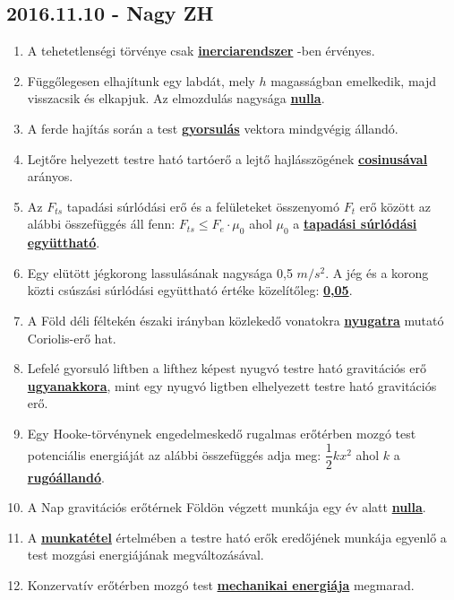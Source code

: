 \documentclass[../../fizika_kerdesek.tex]{subfiles}
\begin{document}
    \subsection{2016.11.10 - Nagy ZH}

        \begin{enumerate}
            \item A tehetetlenségi törvénye csak \underline{\textbf{inerciarendszer}} -ben érvényes.
            \item Függőlegesen elhajítunk egy labdát, mely $h$ magasságban emelkedik, majd visszacsik és elkapjuk. Az elmozdulás nagysága \underline{\textbf{nulla}}.
            \item A ferde hajítás során a test \underline{\textbf{gyorsulás}} vektora  mindgvégig állandó.
            \item Lejtőre helyezett testre ható tartóerő a lejtő hajlásszögének \underline{\textbf{cosinusával}} arányos.
            \item Az $F_{ts}$ tapadási súrlódási erő és a felületeket összenyomó $F_t$ erő között az alábbi összefüggés áll fenn: \underline{\textbf{$F_{ts} \le F_e \cdot \mu_0$}} ahol $\mu_0$ a \underline{\textbf{tapadási súrlódási együttható}}.
            \item Egy elütött jégkorong lassulásának nagysága 0,5 $m/s^2$. A jég és a korong közti csúszási súrlódási együttható értéke közelítőleg: \underline{\textbf{0,05}}.
            \item A Föld déli féltekén északi irányban közlekedő vonatokra \underline{\textbf{nyugatra}} mutató Coriolis-erő hat.
            \item Lefelé gyorsuló liftben a lifthez képest nyugvó testre ható gravitációs erő \underline{\textbf{ugyanakkora}}, mint egy nyugvó ligtben elhelyezett testre ható gravitációs erő.
            \item Egy Hooke-törvénynek engedelmeskedő rugalmas erőtérben mozgó test potenciális energiáját az alábbi összefüggés adja meg: \underline{\textbf{$\dfrac{1}{2}kx^2$}} ahol $k$ a \underline{\textbf{rugóállandó}}.
            \item A Nap gravitációs erőtérnek Földön végzett munkája egy év alatt \underline{\textbf{nulla}}.
            \item A \underline{\textbf{munkatétel}} értelmében a testre ható erők eredőjének munkája egyenlő a test mozgási energiájának megváltozásával.
            \item Konzervatív erőtérben mozgó test \underline{\textbf{mechanikai energiája}} megmarad.
        \end{enumerate}

    \underline{\textbf{}}
\end{document}
